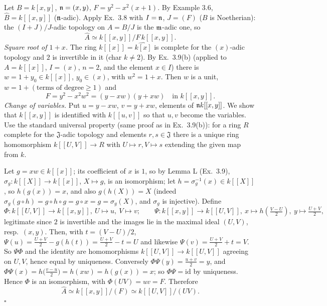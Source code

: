 \documentclass[11pt]{article}
\begin{document}
\pf
Let $B=k[x,y]$, $\mathfrak n=(x,y)$, $F=y^2-x^2(x+1)$. By Example 3.6, $\widehat{B}=k[[x,y]]$ ($\mathfrak n$-adic). Apply Ex.~3.8 with $I=\mathfrak n$, $J=(F)$ ($B$ is Noetherian): the $(I+J)/J$-adic topology on $A=B/J$ is the $\mathfrak m$-adic one, so
\[ \widehat{A}\simeq k[[x,y]]/F\,k[[x,y]]. \]
\emph{Square root of $1+x$.} The ring $k[[x]]=\widehat{k[x]}$ is complete for the $(x)$-adic topology and $2$ is invertible in it (char $k\ne2$). By Ex.~3.9(b) (applied to $A=k[[x]]$, $I=(x)$, $n=2$, and the element $x\in I$) there is $w=1+y_0\in k[[x]]$, $y_0\in(x)$, with $w^2=1+x$. Then $w$ is a unit, $w=1+(\text{terms of degree}\ge1)$ and
\[ F=y^2-x^2w^2=(y-xw)(y+xw)\quad\text{in }k[[x,y]]. \]
\emph{Change of variables.} Put $u=y-xw$, $v=y+xw$, elements of $\mathfrak n k[[x,y]]$. We show that $k[[x,y]]$ is identified with $k[[u,v]]$ so that $u,v$ become the variables. Use the standard universal property (same proof as in Ex.~3.9(b)): for a ring $R$ complete for the $\mathfrak J$-adic topology and elements $r,s\in\mathfrak J$ there is a unique ring homomorphism $k[[U,V]]\to R$ with $U\mapsto r,V\mapsto s$ extending the given map from $k$.

Let $g=xw\in k[[x]]$; its coefficient of $x$ is $1$, so by Lemma L (Ex.~3.9), $\sigma_g:k[[X]]\to k[[x]]$, $X\mapsto g$, is an isomorphism; let $h=\sigma_g^{-1}(x)\in k[[X]]$, so $h(g(x))=x$, and also $g(h(X))=X$ (indeed $\sigma_g(g\circ h)=g\circ h\circ g=g\circ x=g=\sigma_g(X)$, and $\sigma_g$ is injective). Define
\[ \Phi:k[[U,V]]\to k[[x,y]],\ U\mapsto u,\ V\mapsto v;\qquad \Psi:k[[x,y]]\to k[[U,V]],\ x\mapsto h\!\left(\tfrac{V-U}2\right),\ y\mapsto\tfrac{U+V}2, \]
legitimate since $2$ is invertible and the images lie in the maximal ideal $(U,V)$, resp.\ $(x,y)$. Then, with $t=(V-U)/2$, $\Psi(u)=\frac{U+V}2-g(h(t))=\frac{U+V}2-t=U$ and likewise $\Psi(v)=\frac{U+V}2+t=V$. So $\Psi\Phi$ and the identity are homomorphisms $k[[U,V]]\to k[[U,V]]$ agreeing on $U,V$, hence equal by uniqueness. Conversely $\Phi\Psi(y)=\frac{u+v}2=y$, and $\Phi\Psi(x)=h\big(\frac{v-u}2\big)=h(xw)=h(g(x))=x$; so $\Phi\Psi=\mathrm{id}$ by uniqueness. Hence $\Phi$ is an isomorphism, with $\Phi(UV)=uv=F$. Therefore
\[ \widehat{A}\simeq k[[x,y]]/(F)\simeq k[[U,V]]/(UV).\]
\hfill$\square$
\end{document}
